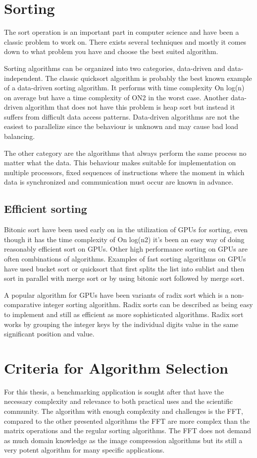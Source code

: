 \section{Sorting}
The sort operation is an important part in computer science and have been a classic problem to work on. There exists several techniques and mostly it comes down to what problem you have and choose the best suited algorithm.

Sorting algorithms can be organized into two categories, data-driven and data-independent. The classic quicksort algorithm is probably the best known example of a data-driven sorting algorithm. It performs with time complexity On log(n) on average but have a time complexity of ON2 in the worst case. Another data-driven algorithm that does not have this problem is heap sort but instead it suffers from difficult data access patterns. Data-driven algorithms are not the easiest to parallelize since the behaviour is unknown and may cause bad load balancing.

The other category are the algorithms that always perform the same process no matter what the data. This behaviour makes suitable for implementation on multiple processors, fixed sequences of instructions where the moment in which data is synchronized and communication must occur are known in advance.

\subsection{Efficient sorting}
Bitonic sort have been used early on in the utilization of GPUs for sorting, even though it has the time complexity of On log(n2) it's been an easy way of doing reasonably efficient sort on GPUs. Other high performance sorting on GPUs are often combinations of algorithms. Examples of fast sorting algorithms on GPUs have used bucket sort or quicksort that first splits the list into sublist and then sort in parallel with merge sort or by using bitonic sort followed by merge sort.

A popular algorithm for GPUs have been variants of radix sort which is a non-comparative integer sorting algorithm. Radix sorts can be described as being easy to implement and still as efficient as more sophisticated algorithms. Radix sort works by grouping the integer keys by the individual digits value in the same significant position and value.

\section{Criteria for Algorithm Selection}
For this thesis, a benchmarking application is sought after that have the necessary complexity and relevance to both practical uses and the scientific community. The algorithm with enough complexity and challenges is the FFT, compared to the other presented algorithms the FFT are more complex than the matrix operations and the regular sorting algorithms. The FFT does not demand as much domain knowledge as the image compression algorithms but its still a very potent algorithm for many specific applications.

